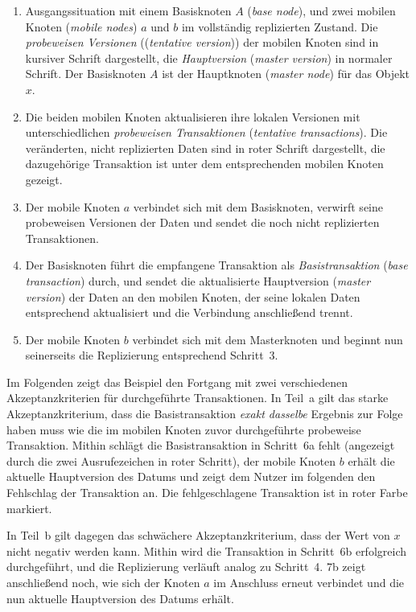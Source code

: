 \documentclass[11pt,a4paper]{scrartcl}
\begin{document}
\begin{enumerate}
\item Ausgangssituation mit einem Basisknoten $A$ (\emph{base node}), und zwei
  mobilen Knoten (\emph{mobile nodes}) $a$ und $b$ im vollständig replizierten
  Zustand.  Die \emph{probeweisen Versionen} ((\emph{tentative version})) der
  mobilen Knoten sind in kursiver Schrift dargestellt, die \emph{Hauptversion}
  (\emph{master version}) in normaler Schrift.  Der Basisknoten $A$ ist der
  Hauptknoten (\emph{master node}) für das Objekt $x$.
\item Die beiden mobilen Knoten aktualisieren ihre lokalen Versionen mit
  unterschiedlichen \emph{probeweisen Transaktionen} (\emph{tentative
    transactions}).  Die veränderten, nicht replizierten Daten sind in roter
  Schrift dargestellt, die dazugehörige Transaktion ist unter dem
  entsprechenden mobilen Knoten gezeigt.
\item Der mobile Knoten $a$ verbindet sich mit dem Basisknoten, verwirft seine
  probeweisen Versionen der Daten und sendet die noch nicht replizierten
  Transaktionen.
\item Der Basisknoten führt die empfangene Transaktion als
  \emph{Basistransaktion} (\emph{base transaction}) durch, und sendet die
  aktualisierte Hauptversion (\emph{master version}) der Daten an den mobilen
  Knoten, der seine lokalen Daten entsprechend aktualisiert und die Verbindung
  anschließend trennt.
\item Der mobile Knoten $b$ verbindet sich mit dem Masterknoten und beginnt nun
  seinerseits die Replizierung entsprechend Schritt~3.
\end{enumerate}

Im Folgenden zeigt das Beispiel den Fortgang mit zwei verschiedenen
Akzeptanzkriterien für durchgeführte Transaktionen.  In Teil~a gilt das starke
Akzeptanzkriterium, dass die Basistransaktion \emph{exakt dasselbe} Ergebnis
zur Folge haben muss wie die im mobilen Knoten zuvor durchgeführte probeweise
Transaktion.  Mithin schlägt die Basistransaktion in Schritt~6a fehlt
(angezeigt durch die zwei Ausrufezeichen in roter Schritt), der mobile Knoten
$b$ erhält die aktuelle Hauptversion des Datums und zeigt dem Nutzer im
folgenden den Fehlschlag der Transaktion an.  Die fehlgeschlagene Transaktion
ist in roter Farbe markiert.

In Teil~b gilt dagegen das schwächere Akzeptanzkriterium, dass der Wert von $x$
nicht negativ werden kann.  Mithin wird die Transaktion in Schritt~6b
erfolgreich durchgeführt, und die Replizierung verläuft analog zu Schritt~4.
7b zeigt anschließend noch, wie sich der Knoten $a$ im Anschluss erneut
verbindet und die nun aktuelle Hauptversion des Datums erhält.
\end{document}
